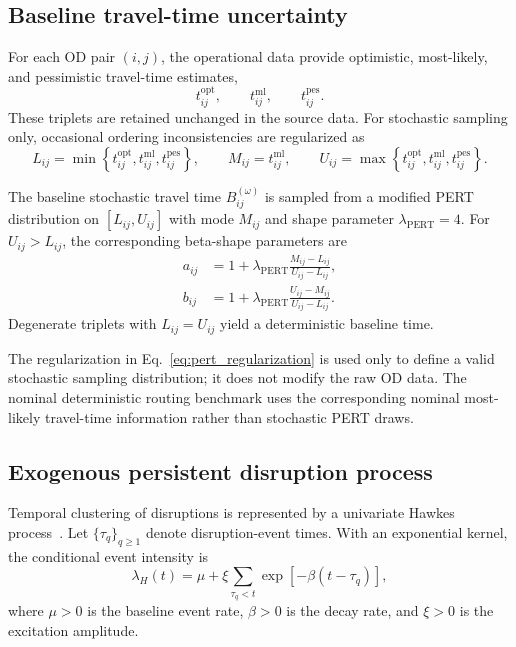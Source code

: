 \documentclass[preprint,12pt]{elsarticle}
\newcommand{\1}{\mathbf{1}}
\begin{document}
\subsection{Baseline travel-time uncertainty}
\label{subsec:baseline_tt}

For each OD pair $(i,j)$, the operational data provide optimistic,
most-likely, and pessimistic travel-time estimates,
\[
t^{\mathrm{opt}}_{ij},
\qquad
t^{\mathrm{ml}}_{ij},
\qquad
t^{\mathrm{pes}}_{ij}.
\]
These triplets are retained unchanged in the source data. For stochastic
sampling only, occasional ordering inconsistencies are regularized as
\begin{equation}
	L_{ij}
	=
	\min\left\{
	t^{\mathrm{opt}}_{ij},
	t^{\mathrm{ml}}_{ij},
	t^{\mathrm{pes}}_{ij}
	\right\},
	\qquad
	M_{ij}=t^{\mathrm{ml}}_{ij},
	\qquad
	U_{ij}
	=
	\max\left\{
	t^{\mathrm{opt}}_{ij},
	t^{\mathrm{ml}}_{ij},
	t^{\mathrm{pes}}_{ij}
	\right\}.
	\label{eq:pert_regularization}
\end{equation}

The baseline stochastic travel time
$B_{ij}^{(\omega)}$ is sampled from a modified PERT distribution on
$[L_{ij},U_{ij}]$ with mode $M_{ij}$ and shape parameter $\lambda_{\mathrm{PERT}}=4$.
For $U_{ij}>L_{ij}$, the corresponding beta-shape parameters are
\begin{align}
	a_{ij}
	&=
	1+
	\lambda_{\mathrm{PERT}}
	\frac{M_{ij}-L_{ij}}{U_{ij}-L_{ij}},
	\\
	b_{ij}
	&=
	1+
	\lambda_{\mathrm{PERT}}
	\frac{U_{ij}-M_{ij}}{U_{ij}-L_{ij}}.
\end{align}
Degenerate triplets with $L_{ij}=U_{ij}$ yield a deterministic baseline time.

The regularization in Eq.~\eqref{eq:pert_regularization} is used only to define
a valid stochastic sampling distribution; it does not modify the raw OD data.
The nominal deterministic routing benchmark uses the corresponding nominal
most-likely travel-time information rather than stochastic PERT draws.

\subsection{Exogenous persistent disruption process}
\label{subsec:hawkes}

Temporal clustering of disruptions is represented by a univariate Hawkes
process~\citep{hawkes1971,bacry2015hawkes}. Let
$\{\tau_q\}_{q\ge1}$ denote disruption-event times. With an exponential kernel,
the conditional event intensity is
\begin{equation}
	\lambda_H(t)
	=
	\mu
	+
	\xi
	\sum_{\tau_q<t}
	\exp\!\left[-\beta(t-\tau_q)\right],
	\label{eq:hawkes_intensity}
\end{equation}
where $\mu>0$ is the baseline event rate, $\beta>0$ is the decay rate, and
$\xi>0$ is the excitation amplitude.
\end{document}
